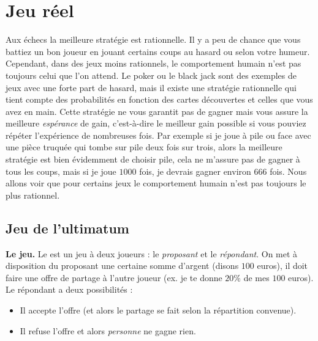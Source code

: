 \documentclass[11pt,class=report,crop=false]{standalone}
\begin{document}







\section{Jeu réel}

Aux échecs la meilleure stratégie est rationnelle. Il y a peu de chance que vous battiez un bon joueur en jouant certains coups au hasard ou selon votre humeur. Cependant, dans des jeux moins rationnels, le comportement humain n'est pas toujours celui que l'on attend. Le poker ou le black jack sont des exemples de jeux avec une forte part de hasard, mais il existe une stratégie rationnelle qui tient compte des probabilités en fonction des cartes découvertes et celles que vous avez en main.
Cette stratégie ne vous garantit pas de gagner mais vous assure la meilleure \emph{espérance} de gain, c'est-à-dire le meilleur gain possible si vous pouviez répéter l'expérience de nombreuses fois. Par exemple si je joue à pile ou face avec une pièce truquée qui tombe sur \og{}pile\fg{} deux fois sur trois, alors la meilleure stratégie est bien évidemment de choisir \og{}pile\fg{}, cela ne m'assure pas de gagner à tous les coups, mais si je joue $1000$ fois, je devrais gagner environ 666 fois. Nous allons voir que pour certains jeux le comportement humain n'est pas toujours le plus rationnel.

\subsection{Jeu de l'ultimatum}

\textbf{Le jeu.}
Le  est un jeu à deux joueurs : le \emph{proposant} et le \emph{répondant}. On met à disposition du proposant une certaine somme d'argent (disons $100$ euros), il doit faire une offre de partage à l'autre joueur (ex. \og{}je te donne $20\%$ de mes $100$ euros\fg{}). Le répondant a deux possibilités :
\begin{itemize}
	\item Il accepte l'offre (et alors le partage se fait selon la répartition convenue).
	\item Il refuse l'offre et alors \emph{personne} ne gagne rien.
\end{itemize}
\end{document}
